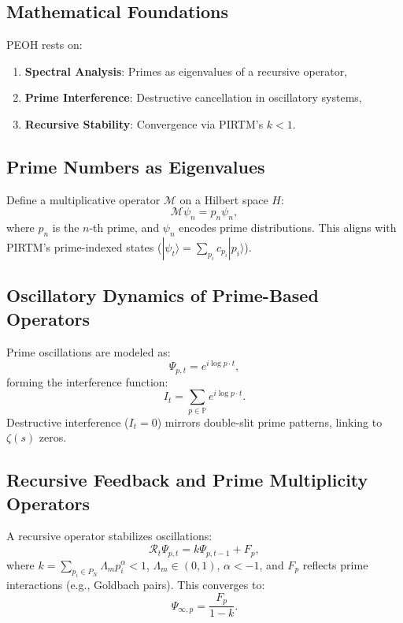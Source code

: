 \documentclass{article}
\begin{document}
\subsection{Mathematical Foundations}
PEOH rests on:
\begin{enumerate}
    \item \textbf{Spectral Analysis}: Primes as eigenvalues of a recursive operator,
    \item \textbf{Prime Interference}: Destructive cancellation in oscillatory systems,
    \item \textbf{Recursive Stability}: Convergence via PIRTM’s \( k < 1 \).
\end{enumerate}

\subsection{Prime Numbers as Eigenvalues}
Define a multiplicative operator \( \mathcal{M} \) on a Hilbert space \( H \):
\begin{equation}
    \mathcal{M} \psi_n = p_n \psi_n,
\end{equation}
where \( p_n \) is the \( n \)-th prime, and \( \psi_n \) encodes prime distributions. This aligns with PIRTM’s prime-indexed states (\( |\psi_t\rangle = \sum_{p_i} c_{p_i} |p_i\rangle \)).

\subsection{Oscillatory Dynamics of Prime-Based Operators}
Prime oscillations are modeled as:
\begin{equation}
    \Psi_{p,t} = e^{i \log p \cdot t},
\end{equation}
forming the interference function:
\begin{equation}
    I_t = \sum_{p \in \mathbb{P}} e^{i \log p \cdot t}.
\end{equation}
Destructive interference (\( I_t = 0 \)) mirrors double-slit prime patterns, linking to \( \zeta(s) \) zeros.

\subsection{Recursive Feedback and Prime Multiplicity Operators}
A recursive operator stabilizes oscillations:
\begin{equation}
    \mathcal{R}_t \Psi_{p,t} = k \Psi_{p,t-1} + F_p,
\end{equation}
where \( k = \sum_{p_i \in P_N} \Lambda_m p_i^\alpha < 1 \), \( \Lambda_m \in (0,1) \), \( \alpha < -1 \), and \( F_p \) reflects prime interactions (e.g., Goldbach pairs). This converges to:
\begin{equation}
    \Psi_{\infty,p} = \frac{F_p}{1 - k}.
\end{equation}
\end{document}
